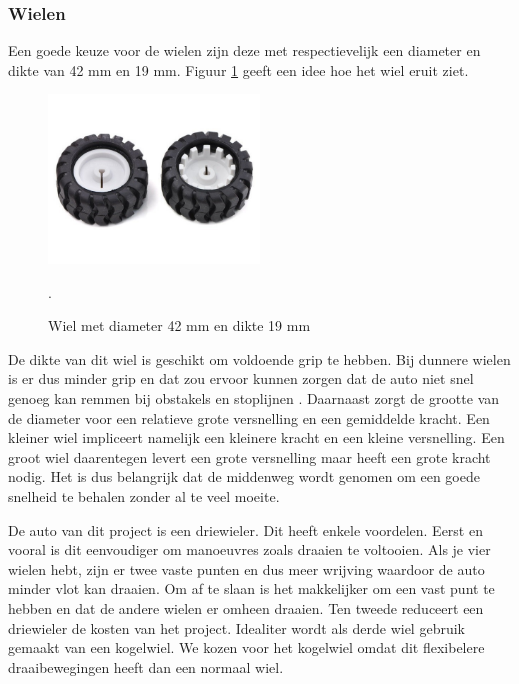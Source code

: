\documentclass[a4paper,twoside,kulak]{kulakreport} %
\begin{document}
\subsubsection{Wielen}
Een goede keuze voor de wielen zijn deze met respectievelijk een diameter en dikte van 42 mm en 19 mm.
Figuur \ref{fig:wiel} geeft een idee hoe het wiel eruit ziet.

\begin{figure}
	\includegraphics[width=0.5\textwidth]{wielen}
	\centering
	\caption{ Wiel met diameter 42 mm en dikte 19 mm} 
	\cite{Wiel42x19mm}.
	\label{fig:wiel}
\end{figure}

 De dikte van dit wiel is geschikt om voldoende grip te hebben. Bij dunnere wielen is er dus minder grip en dat zou ervoor kunnen zorgen dat de auto niet snel genoeg kan remmen bij obstakels en stoplijnen \cite{Banden}. 
 Daarnaast zorgt de grootte van de diameter voor een relatieve grote versnelling en een gemiddelde kracht. Een kleiner wiel impliceert namelijk een kleinere kracht en een kleine versnelling. Een groot wiel daarentegen levert een grote versnelling maar heeft een grote kracht nodig. Het is dus belangrijk dat de middenweg wordt genomen om een goede snelheid te behalen zonder al te veel moeite.  

De auto van dit project is een driewieler. Dit heeft enkele voordelen. Eerst en vooral is dit eenvoudiger om manoeuvres zoals draaien te voltooien. Als je vier wielen hebt, zijn er twee vaste punten en dus meer wrijving waardoor de auto minder vlot kan draaien. Om af te slaan is het makkelijker om een vast punt te hebben en dat de andere wielen er omheen draaien.%
Ten tweede reduceert een driewieler de kosten van het project. Idealiter wordt als derde wiel gebruik gemaakt van een kogelwiel. We kozen voor het kogelwiel omdat dit flexibelere draaibewegingen heeft dan een normaal wiel. 
\label{Wielen}
~
\end{document}
